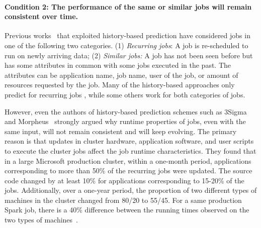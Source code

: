 
\paragraph{Condition 2: The performance of the same
{or similar} jobs will remain consistent over time.}
Previous works~\cite{3Sigma, morpheus, corral, jockey:eurosys2012} that exploited
history-based prediction have considered jobs in one of
the following two categories.
(1) {\em Recurring jobs}: A job is re-scheduled to run on newly arriving data;
(2) {\em Similar jobs:} A job has not been seen before but has some
attributes in common with some jobs executed in the past. The
attributes can be application name, job name, user of
the job, or amount of resources requested by the job.
Many of the history-based approaches only predict for recurring jobs \cite{morpheus, corral,
jockey:eurosys2012}, while some others \cite{3Sigma, jamiasvu, stratus:socc2018, roughSetEstimation:IEEE:Shonali} work for both categories of jobs.

However, even the authors of history-based prediction schemes such as
3Sigma~\cite{3Sigma} and Morpheus~\cite{morpheus} strongly argued why
runtime properties of jobs, even with the same input, will not remain consistent
and will keep evolving.  The primary reason is that updates in cluster
hardware, application software, and user scripts to execute the cluster jobs
affect the job runtime characteristics.
{They found that}
in a large Microsoft production cluster, within a one-month period,
applications corresponding to more than 50\% of the recurring jobs were
updated. The source code changed by at least 10\% for applications
corresponding to 15-20\% of the jobs.  Additionally, over a one-year period,
the proportion of two different types of machines in the cluster
changed from 80/20 to 55/45. For a same production Spark job, there is
a 40\% difference between the running times observed on the two types of
machines~\cite{morpheus}.  

